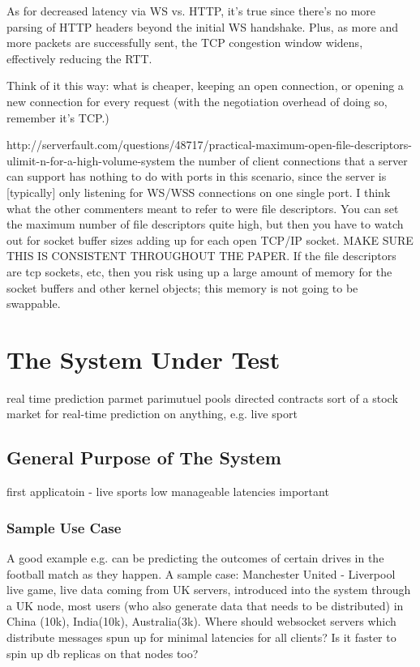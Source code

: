 \documentclass{uvamscse}
\begin{document}
As for decreased latency via WS vs. HTTP, it's true since there's no more parsing of HTTP headers beyond the initial WS handshake. Plus, as more and more packets are successfully sent, the TCP congestion window widens, effectively reducing the RTT.

Think of it this way: what is cheaper, keeping an open connection, or opening a new connection for every request (with the negotiation overhead of doing so, remember it's TCP.)

http://serverfault.com/questions/48717/practical-maximum-open-file-descriptors-ulimit-n-for-a-high-volume-system
the number of client connections that a server can support has nothing to do with ports in this scenario, since the server is [typically] only listening for WS/WSS connections on one single port. I think what the other commenters meant to refer to were file descriptors. You can set the maximum number of file descriptors quite high, but then you have to watch out for socket buffer sizes adding up for each open TCP/IP socket.  MAKE SURE THIS IS CONSISTENT THROUGHOUT THE PAPER.
If the file descriptors are tcp sockets, etc, then you risk using up a large amount of memory for the socket buffers and other kernel objects; this memory is not going to be swappable.


\chapter{The System Under Test}\label{The System Under Test}

real time prediction parmet
parimutuel pools
directed contracts
sort of a stock market for real-time prediction on anything, e.g. live sport

\section{General Purpose of The System}
first applicatoin - live sports
low manageable latencies important

\subsection{Sample Use Case}
A good example e.g. can be predicting the outcomes of certain drives in the football match as they happen. A sample case: Manchester United - Liverpool live game, live data coming from UK servers, introduced into the system through a UK node, most users (who also generate data that needs to be distributed) in China (10k), India(10k), Australia(3k). Where should websocket servers which distribute messages spun up for minimal latencies for all clients? Is it faster to spin up db replicas on that nodes too?
\end{document}
